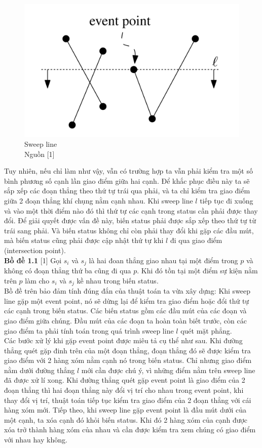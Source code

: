 \documentclass[15pt]{article}
\begin{document}
{\begin{figure}[h!]
\centering
\includegraphics[scale=0.25]{./sweep_line.png}
\caption{Sweep line \\ Nguồn [1]}
\label{fig:sweep line}
\end{figure}
Tuy nhiên, nếu chỉ làm như vậy, vẫn có trường hợp ta vẫn phải kiểm tra một số bình phương số cạnh lần giao điểm giữa hai cạnh. Để khắc phục điều này ta sẽ sắp xếp các đoạn thẳng theo thứ tự trái qua phải, và ta chỉ kiểm tra giao điểm giữa 2 đoạn thẳng khí chụng nằm cạnh nhau. Khi sweep line $l$ tiếp tục đi xuống và vào một thời điểm nào đó thì thứ tự các cạnh trong status cần phải được thay đổi. Để giải quyết được vấn đề này, biến status phải được sắp xếp theo thứ tự từ trái sang phải. Và biến status không chỉ còn phải thay đổi khi gặp các đầu mút, mà biến status cũng phải được cập nhật thứ tự khi $l$ đi qua giao điểm (intersection point). \\
\textbf{Bồ đề 1.1} [1] Gọi $s_i$ và $s_j$ là hai đoan thẳng giao nhau tại một điểm trong $p$ và không có đoạn thẳng thứ ba cũng đi qua $p$. Khi đó tồn tại một điểm sự kiện nằm trên $p$ làm cho $s_i$ và $s_j$ kề nhau trong biến status.\\

Bồ đề trên bảo đảm tính đúng đắn của thuật toán ta vừa xây dựng: Khi sweep line gặp một event point, nó sẽ dừng lại để kiểm tra giao điểm hoặc đổi thứ tự các cạnh trong biến status. Các biến status gồm các đầu mút của các đoạn và giao điểm giữa chúng. Đầu mút của các đoạn ta hoàn toàn biết trước, còn các giao điểm ta phải tính toán trong quá trình sweep line $l$ quét mặt phẳng. \\

Các bước xử lý khi gặp event point được miêu tả cụ thể như sau. Khi đường thẳng quét gặp đinh trên của một đoạn thẳng, đoạn thẳng đó sẽ được kiểm tra giao điểm với 2 hàng xóm nằm cạnh nó trong biến status. Chỉ nhưng giao điểm nằm dưới đường thẳng $l$ mới cần được chú ý, vì những điểm nằm trên sweep line đã được xử lí xong. Khi đường thẳng quét gặp event point là giao điểm của 2 đoạn thẳng thì hai đoạn thẳng này đổi vị trí cho nhau trong event point, khi thay đổi vị trí, thuật toán tiếp tục kiểm tra giao điểm của 2 đoạn thẳng với cái hàng xóm mới. Tiếp theo, khi sweep line gặp event point là đầu mút dưới của một cạnh, ta xóa cạnh đó khỏi biến status. Khi đó 2 hàng xóm của cạnh được xóa trở thành hàng xóm của nhau và cần được kiểm tra xem chúng có giao điểm với nhau hay không. \\

}
\end{document}
